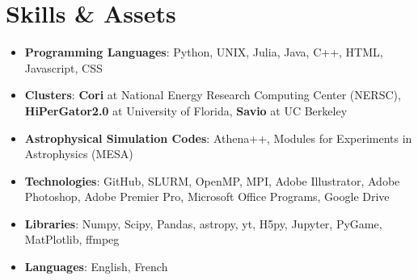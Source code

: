 \documentclass[letterpaper,10pt]{article}
\newcommand{\resumeSubHeadingListStart}{\begin{itemize}[leftmargin=*]}
\newcommand{\resumeSubHeadingListEnd}{\end{itemize}}
\newcommand{\shorterSection}[1]{\vspace{-10pt}\section{#1}}
\begin{document}
\shorterSection{Skills \& Assets}
  \resumeSubHeadingListStart
  \small
    \item{
     \textbf{Programming Languages}{: Python, UNIX, Julia, Java, C++, HTML, Javascript, CSS}
    }
    \vspace{-3pt}
    \item{
     \textbf{Clusters}{: \textbf{Cori} at National Energy Research Computing Center (NERSC), \textbf{HiPerGator2.0} at University of Florida, \textbf{Savio} at UC Berkeley}
    }
    \vspace{-3pt}
    \item{
     \textbf{Astrophysical Simulation Codes}{: Athena++, Modules for Experiments in Astrophysics (MESA)}
    }
    \vspace{-3pt}
    \item{
     \textbf{Technologies}{: GitHub, SLURM, OpenMP, MPI, Adobe Illustrator, Adobe Photoshop, Adobe Premier Pro, Microsoft Office Programs, Google Drive}
    }
    \vspace{-3pt}
    \item{
     \textbf{Libraries}{: Numpy, Scipy, Pandas, astropy, yt, H5py, Jupyter, PyGame, MatPlotlib, ffmpeg}
    }
    \vspace{-3pt}
    \item{
     \textbf{Languages}{: English, French}
    }
\resumeSubHeadingListEnd
\end{document}
